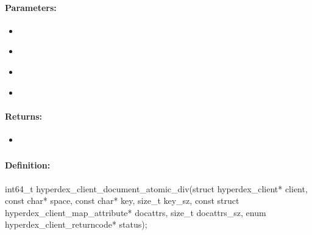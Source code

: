 \paragraph{Parameters:}
\begin{itemize}[noitemsep]
\item {}\\

\item {}\\

\item {}\\

\item {}\\

\end{itemize}

\paragraph{Returns:}
\begin{itemize}[noitemsep]
\item {}\\

\end{itemize}

\pagebreak
\subsubsection{}
\label{api:c:document_atomic_div}


\paragraph{Definition:}
\begin{ccode}
int64_t hyperdex_client_document_atomic_div(struct hyperdex_client* client,
        const char* space,
        const char* key, size_t key_sz,
        const struct hyperdex_client_map_attribute* docattrs, size_t docattrs_sz,
        enum hyperdex_client_returncode* status);
\end{ccode}

